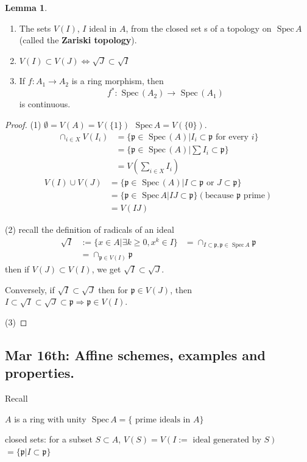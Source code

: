 \documentclass[11pt]{article}
\theoremstyle{definition}
\newtheorem{lemma}[thm]{Lemma}
\newcommand{\spec}{\text{ Spec}\,}
\newcommand{\scp}{{\mathfrak p}}
\newcommand{\Lrta}{\Longrightarrow}
\newcommand{\lrta}{\longrightarrow}
\newcommand{\Llrta}{\Longleftrightarrow}
\begin{document}
\begin{lemma}\ 
\begin{enumerate}[label=(\arabic*)]
\item The sets $V(I)$, $I$ ideal in $A$, from  the closed set s of a topology on $\spec A$ (called the \textbf{Zariski topology}).
\item $V(I)\subset V(J)\Llrta \sqrt{J}\subset \sqrt{I}$
\item If $f: A_1\lrta A_2$ is a ring morphism, then 
$$
f^*:\spec(A_2)\lrta \spec(A_1)
$$
is continuous.
\end{enumerate}
\end{lemma}
\begin{proof}
(1) $\emptyset =V(A)=V(\{1\})$ $\spec A=V(\{0\})$.
$$
\begin{aligned}
\cap_{i\in X}V(I_i)&=\{\scp\in \spec(A)|I_i\subset \scp\text{ for every $i$}\}\\
&=\{\scp\in \spec(A)|\sum I_i\subset \scp\}\\
&= V\left(\sum_{i\in X}I_i\right)
\end{aligned}
$$
$$
\begin{aligned}
V(I)\cup V(J)&=\{\scp\in\spec (A)|I\subset \scp\text{  or } J\subset \scp\}\\
&=\{\scp\in\spec A|I J\subset \scp\}(\text{because $\scp$ prime})\\
&=V(IJ)
\end{aligned}
$$

(2) recall the definition of radicals of an ideal 
$$
\begin{aligned}
\sqrt{I}&:=\{x\in A|\exists k\geq 0, x^k\in I\}
&=\cap_{I\subset \scp,\scp\in\spec A}\scp\\
&=\cap_{\scp \in V(I)}\scp
\end{aligned}
$$
then if $V(J)\subset V(I)$, we get $\sqrt{I}\subset \sqrt{J}$.

Conversely, if $\sqrt{I}\subset \sqrt{J}$ then for $\scp\in V(J)$, then
$I\subset \sqrt{I}\subset\sqrt{J}\subset \scp\Lrta \scp\in V(I)$.

(3)
\end{proof}

\subsection{Mar 16th: Affine schemes, examples and properties.}
Recall

$A$ is a ring with unity
$\spec A=\{\text{ prime ideals in $A$}\}$

closed sets: for a subset $S\subset A$,
$V(S)=V(I:=\text{ ideal generated by $S$})$ $=\{\scp|I\subset \scp\}$
\end{document}

